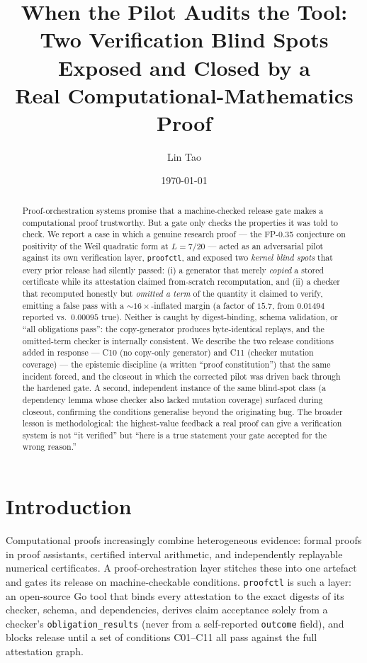\documentclass[11pt,a4paper]{amsart}
\title{When the Pilot Audits the Tool: \\
       Two Verification Blind Spots Exposed and Closed by a \\
       Real Computational-Mathematics Proof}
\author{Lin Tao}
\date{\today}
\theoremstyle{plain}
\theoremstyle{definition}
\newcommand{\proofctl}{\texttt{proofctl}}
\newcommand{\CtenA}{\textsf{C10}}
\newcommand{\CelevenA}{\textsf{C11}}
\begin{document}
\begin{abstract}
Proof-orchestration systems promise that a machine-checked release gate makes a
computational proof trustworthy. But a gate only checks the properties it was
told to check. We report a case in which a genuine research proof --- the
FP-0.35 conjecture on positivity of the Weil quadratic form at $L=7/20$ --- acted
as an adversarial pilot against its own verification layer, \proofctl, and
exposed two \emph{kernel blind spots} that every prior release had silently
passed: (i) a generator that merely \emph{copied} a stored certificate while its
attestation claimed from-scratch recomputation, and (ii) a checker that
recomputed honestly but \emph{omitted a term} of the quantity it claimed to
verify, emitting a false pass with a $\sim\!16\times$-inflated margin (a factor of
$15.7$, from $0.01494$ reported vs.\ $0.00095$ true). Neither is
caught by digest-binding, schema validation, or ``all obligations pass'':
the copy-generator produces byte-identical replays, and the omitted-term checker
is internally consistent. We describe the two release conditions added in
response --- \CtenA{} (no copy-only generator) and \CelevenA{} (checker mutation
coverage) --- the epistemic discipline (a written ``proof constitution'') that
the same incident forced, and the closeout in which the corrected pilot was
driven back through the hardened gate. A second, independent instance of the
same blind-spot class (a dependency lemma whose checker also lacked mutation
coverage) surfaced during closeout, confirming the conditions generalise beyond
the originating bug. The broader lesson is methodological: the highest-value
feedback a real proof can give a verification system is not ``it verified'' but
``here is a true statement your gate accepted for the wrong reason.''
\end{abstract}

\maketitle

\section{Introduction}

Computational proofs increasingly combine heterogeneous evidence: formal proofs
in proof assistants, certified interval arithmetic, and independently replayable
numerical certificates. A proof-orchestration layer stitches these into one
artefact and gates its release on machine-checkable conditions. \proofctl{} is
such a layer: an open-source Go tool that binds every attestation to the exact
digests of its checker, schema, and dependencies, derives claim acceptance
solely from a checker's \texttt{obligation\_results} (never from a self-reported
\texttt{outcome} field), and blocks release until a set of conditions
\textsf{C01}--\textsf{C11} all pass against the full attestation graph.
\end{document}

